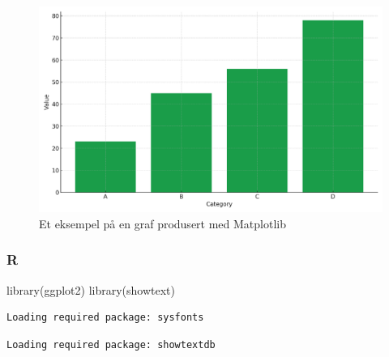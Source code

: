 \documentclass[
  10pt,
]{scrartcl}
\newenvironment{Shaded}{\begin{snugshade}}{\end{snugshade}}
\newcommand{\FunctionTok}[1]{\textcolor[rgb]{0.28,0.35,0.67}{#1}}
\newcommand{\NormalTok}[1]{\textcolor[rgb]{0.00,0.23,0.31}{#1}}
\begin{document}
\begin{figure}

\caption{\label{fig-example1}Et eksempel på en graf produsert med
Matplotlib}

\includegraphics{./fig1.pdf}

\end{figure}%

\subsubsection{R}\label{r}

\begin{Shaded}
\begin{Highlighting}[]
\FunctionTok{library}\NormalTok{(ggplot2)}
\FunctionTok{library}\NormalTok{(showtext)}
\end{Highlighting}
\end{Shaded}

\begin{verbatim}
Loading required package: sysfonts
\end{verbatim}

\begin{verbatim}
Loading required package: showtextdb
\end{verbatim}
\end{document}
